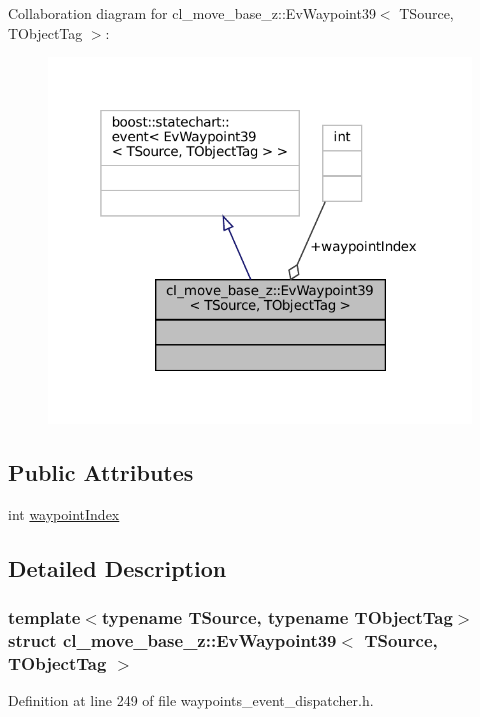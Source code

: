 Collaboration diagram for cl\+\_\+move\+\_\+base\+\_\+z\+:\+:Ev\+Waypoint39$<$ T\+Source, T\+Object\+Tag $>$\+:
\nopagebreak
\begin{figure}[H]
\begin{center}
\leavevmode
\includegraphics[width=319pt]{structcl__move__base__z_1_1EvWaypoint39__coll__graph}
\end{center}
\end{figure}
\subsection*{Public Attributes}
\begin{DoxyCompactItemize}
\item 
int \hyperlink{structcl__move__base__z_1_1EvWaypoint39_ad534650b0b970f9441f0824433932657}{waypoint\+Index}
\end{DoxyCompactItemize}


\subsection{Detailed Description}
\subsubsection*{template$<$typename T\+Source, typename T\+Object\+Tag$>$\newline
struct cl\+\_\+move\+\_\+base\+\_\+z\+::\+Ev\+Waypoint39$<$ T\+Source, T\+Object\+Tag $>$}



Definition at line 249 of file waypoints\+\_\+event\+\_\+dispatcher.\+h.



